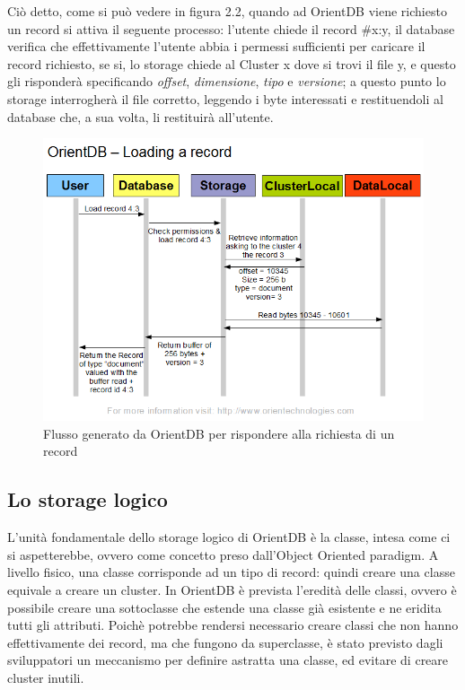 Ciò detto, come si può vedere in figura 2.2, quando ad OrientDB viene richiesto un record si attiva il seguente processo: l'utente chiede il record \#x:y, il database verifica che effettivamente l'utente abbia i permessi sufficienti per caricare il record richiesto, se si, lo storage chiede al Cluster x dove si trovi il file y, e questo gli risponderà specificando \emph{offset}, \emph{dimensione}, \emph{tipo} e \emph{versione}; a questo punto lo storage interrogherà il file corretto, leggendo i byte interessati e restituendoli al database che, a sua volta, li restituirà all'utente.
\begin{figure}
\centering
\includegraphics[scale=0.5]{./orientFlow.png}
\caption{Flusso generato da OrientDB per rispondere alla richiesta di un record}
\label{fig:2}
\end{figure}

\subsection{Lo storage logico}
L'unità fondamentale dello storage logico di OrientDB è la classe, intesa come ci si aspetterebbe, ovvero come concetto preso dall'Object
Oriented paradigm. A livello fisico, una classe corrisponde ad un tipo di record: quindi creare una classe equivale a creare un cluster.
In OrientDB è prevista l'eredità delle classi, ovvero è possibile creare una sottoclasse che estende una classe già esistente e ne eridita tutti gli attributi. Poichè potrebbe rendersi necessario creare classi che non hanno effettivamente dei record, ma che fungono da superclasse, è stato previsto dagli sviluppatori un meccanismo per definire astratta una classe, ed evitare di creare cluster inutili.

